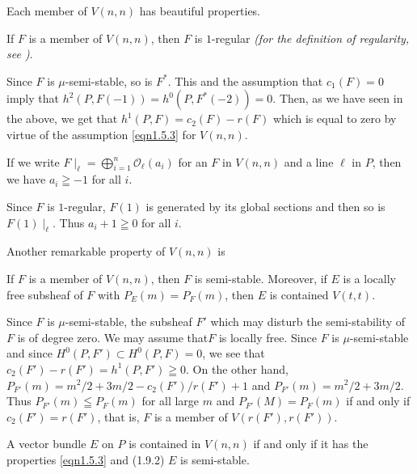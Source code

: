 Each member of $V(n,n)$ has beautiful properties.

\begin{lemma}\label{lemma1.8}
If $F$ is a member of $V(n,n)$, then $F$ is $1$-regular {\em (for the
definition of regularity, see \cite{key8})}.
\end{lemma}

\begin{Proof}
Since $F$ is $\mu$-semi-stable, so is $F^{\ast}$. This and the
assumption that $c_1(F)=0$ imply that
$h^{2}(P,F(-1))=h^{0}(P,F^{\ast}(-2))=0$. Then, as we have seen in the
above, we get that $h^{1}(P,F)=c_2(F)-r(F)$ which is equal to zero by
virtue of the assumption \eqref{eqn1.5.3} for $V(n,n)$.
\enprf
\end{Proof}

\begin{cor}\label{cor1.8.1}
If we write
$F\mid_\ell=\bigoplus\limits_{i=1}^{n}\mathscr{O}_{\ell}(a_i)$ for an
$F$ in $V(n,n)$ and a line $\ell$ in $P$, then we have $a_i\geqq-1$
for all $i$.
\end{cor}

\begin{Proof}
Since $F$ is $1$-regular, $F(1)$ is generated by its global sections
and then so is $F(1)\mid_{\ell}$. Thus $a_i+1\geqq 0$ for all $i$.
\enprf
\end{Proof}

Another remarkable property of $V(n,n)$ is 

\begin{lemma}\label{lemma1.9}
If $F$ is a member of $V(n,n)$, then $F$ is semi-stable. Moreover, if
$E$ is a locally free subsheaf of $F$ with $P_E(m)=P_F(m)$, then $E$
is contained $V(t,t)$.
\end{lemma}

\begin{Proof}
Since $F$ is $\mu$-semi-stable, the subsheaf $F'$ which may disturb
the semi-stability of $F$ is of degree zero. 
We may assume that\pageoriginale $F$ is
locally free. Since $F$ is $\mu$-semi-stable and since
$H^{0}(P,F')\subset H^{0}(P,F)=0$, we see that
$c_2(F')-r(F')=h^{1}(P,F')\geqq 0$. On the other hand,
$P_{F'}(m)=m^{2}/2+3m/2-c_2(F')/r(F')+1$ and
$P_{F'}(m)=m^{2}/2+3m/2$. Thus $P_{F'}(m)\leqq
P_F(m)$ for all large $m$ and $P_{F'}(M)=P_F(m)$ if and only if
$c_2(F')=r(F')$, that is, $F$ is a member of $V(r(F'),r(F'))$.
\enprf
\end{Proof}

\begin{cor}\label{cor1.9.1}
A vector bundle $E$ on $P$ is contained in $V(n,n)$ if and only if it
has the properties \eqref{eqn1.5.3} and (1.9.2) $E$ is semi-stable.
\end{cor}

